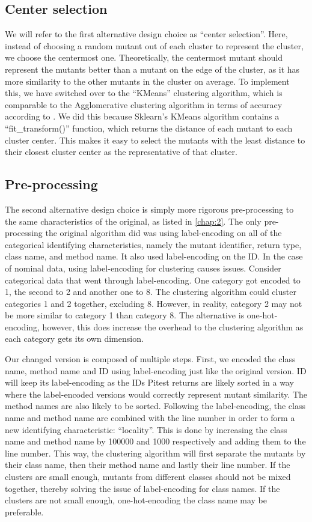 \documentclass[twoside]{uva-inf-bachelor-thesis}
\begin{document}
\subsection{Center selection}
We will refer to the first alternative design choice as ``center selection''. Here, instead of choosing a random mutant out of each cluster to represent the cluster, we choose the centermost one. Theoretically, the centermost mutant should represent the mutants better than a mutant on the edge of the cluster, as it has more similarity to the other mutants in the cluster on average. To implement this, we have switched over to the ``KMeans'' clustering algorithm, which is comparable to the Agglomerative clustering algorithm in terms of accuracy according to \textcite{Mouissie22}. We did this because Sklearn's KMeans algorithm contains a ``fit\_transform()'' function, which returns the distance of each mutant to each cluster center. This makes it easy to select the mutants with the least distance to their closest cluster center as the representative of that cluster.

\subsection{Pre-processing}
The second alternative design choice is simply more rigorous pre-processing to the same characteristics of the original, as listed in \cref{chap:2}. The only pre-processing the original algorithm did was using label-encoding on all of the categorical identifying characteristics, namely the mutant identifier, return type, class name, and method name. It also used label-encoding on the ID. In the case of nominal data, using label-encoding for clustering causes issues. Consider categorical data that went through label-encoding. One category got encoded to 1, the second to 2 and another one to 8. The clustering algorithm could cluster categories 1 and 2 together, excluding 8. However, in reality, category 2 may not be more similar to category 1 than category 8. The alternative is one-hot-encoding, however, this does increase the overhead to the clustering algorithm as each category gets its own dimension.

Our changed version is composed of multiple steps. First, we encoded the class name, method name and ID using label-encoding just like the original version. ID will keep its label-encoding as the IDs Pitest returns are likely sorted in a way where the label-encoded versions would correctly represent mutant similarity. The method names are also likely to be sorted. Following the label-encoding, the class name and method name are combined with the line number in order to form a new identifying characteristic: ``locality''. This is done by increasing the class name and method name by 100000 and 1000 respectively and adding them to the line number. This way, the clustering algorithm will first separate the mutants by their class name, then their method name and lastly their line number. If the clusters are small enough, mutants from different classes should not be mixed together, thereby solving the issue of label-encoding for class names. If the clusters are not small enough, one-hot-encoding the class name may be preferable. 
\end{document}
